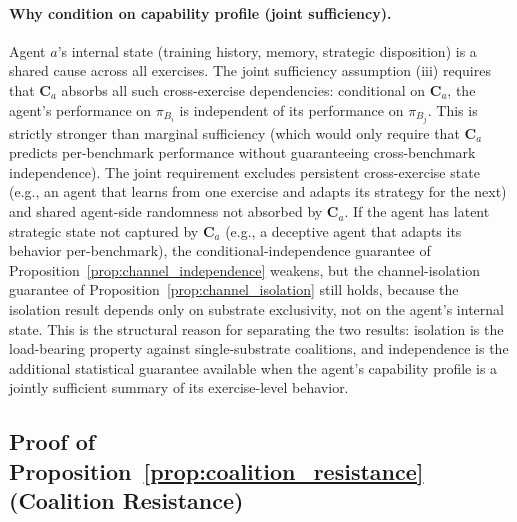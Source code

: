\paragraph{Why condition on capability profile (joint sufficiency).}
Agent $a$'s internal state (training history, memory, strategic
disposition) is a shared cause across all exercises.  The joint
sufficiency assumption (iii) requires that $\mathbf{C}_a$ absorbs
all such cross-exercise dependencies: conditional on $\mathbf{C}_a$,
the agent's performance on $\pi_{B_i}$ is independent of its
performance on $\pi_{B_j}$.  This is strictly stronger than marginal
sufficiency (which would only require that $\mathbf{C}_a$ predicts
per-benchmark performance without guaranteeing cross-benchmark
independence).  The joint requirement excludes persistent
cross-exercise state (e.g., an agent that learns from one exercise
and adapts its strategy for the next) and shared agent-side
randomness not absorbed by $\mathbf{C}_a$.
If the agent has latent strategic state not captured by $\mathbf{C}_a$
(e.g., a deceptive agent that adapts its behavior per-benchmark),
the conditional-independence guarantee of
Proposition~\ref{prop:channel_independence} weakens, but the
channel-isolation guarantee of
Proposition~\ref{prop:channel_isolation} still holds, because the
isolation result depends only on substrate exclusivity, not on the
agent's internal state.  This is the structural reason for separating
the two results: isolation is the load-bearing property against
single-substrate coalitions, and independence is the additional
statistical guarantee available when the agent's capability profile
is a jointly sufficient summary of its exercise-level behavior.

\subsection{Proof of Proposition~\ref{prop:coalition_resistance}
(Coalition Resistance)}
\label{app:coalition_resistance}

